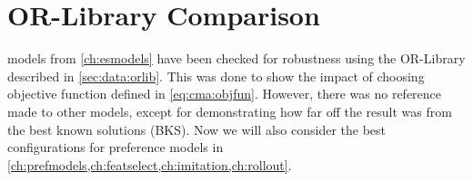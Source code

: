 

\chapter{OR-Library Comparison}\label{ch:orlibrobust} 

 models from 
\cref{ch:esmodels} have been checked for robustness using the OR-Library 
described in \cref{sec:data:orlib}. This was done to show the 
impact of choosing objective function defined in \cref{eq:cma:objfun}. 
However, there was no reference made to other models, except for demonstrating 
how far off the result was from the best known solutions (BKS).
Now we will also consider the best configurations for preference models in 
\cref{ch:prefmodels,ch:featselect,ch:imitation,ch:rollout}.

